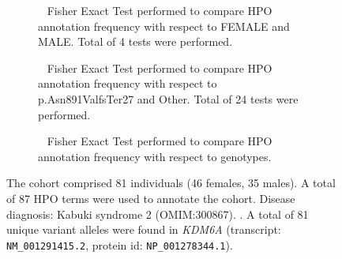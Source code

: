\begin{figure}[htbp]
\begin{subfigure}[b]{0.95\textwidth}
\centering
{}
\captionsetup{justification=raggedright,singlelinecheck=false}
\caption{         Fisher Exact Test performed to compare HPO annotation frequency with respect to FEMALE and MALE. Total of
        4 tests were performed. }
\end{subfigure}
\vspace{2em}
\begin{subfigure}[b]{0.95\textwidth}
\centering
{}
\captionsetup{justification=raggedright,singlelinecheck=false}
\caption{         Fisher Exact Test performed to compare HPO annotation frequency with respect to p.Asn891ValfsTer27 and Other. Total of
        24 tests were performed. }
\end{subfigure}
\vspace{2em}
\begin{subfigure}[b]{0.95\textwidth}
\centering
{}
\captionsetup{justification=raggedright,singlelinecheck=false}
\caption{             Fisher Exact Test performed to compare HPO annotation frequency with respect to genotypes. }
\end{subfigure}

\vspace{2em}

\caption{ The cohort comprised 81 individuals (46 females, 35 males). A total of 87 HPO terms were used to annotate the cohort. Disease diagnosis: Kabuki syndrome 2 (OMIM:300867). . A total of 81 unique variant alleles were found in \textit{KDM6A} (transcript: \texttt{NM\_001291415.2}, protein id: \texttt{NP\_001278344.1}).}
\end{figure}
